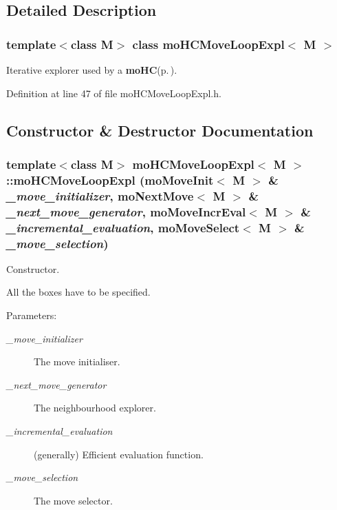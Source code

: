 \subsection{Detailed Description}
\subsubsection*{template$<$class M$>$ class mo\-HCMove\-Loop\-Expl$<$ M $>$}

Iterative explorer used by a {\bf mo\-HC}{\rm (p.\,\pageref{classmo_h_c})}. 



Definition at line 47 of file mo\-HCMove\-Loop\-Expl.h.

\subsection{Constructor \& Destructor Documentation}
\subsubsection{\setlength{\rightskip}{0pt plus 5cm}template$<$class M$>$ {\bf mo\-HCMove\-Loop\-Expl}$<$ M $>$::{\bf mo\-HCMove\-Loop\-Expl} ({\bf mo\-Move\-Init}$<$ M $>$ \& {\em \_\-move\_\-initializer}, {\bf mo\-Next\-Move}$<$ M $>$ \& {\em \_\-next\_\-move\_\-generator}, {\bf mo\-Move\-Incr\-Eval}$<$ M $>$ \& {\em \_\-incremental\_\-evaluation}, {\bf mo\-Move\-Select}$<$ M $>$ \& {\em \_\-move\_\-selection})\hspace{0.3cm}{\tt  [inline]}}\label{classmo_h_c_move_loop_expl_a0}


Constructor. 

All the boxes have to be specified.

\begin{Desc}
\item[Parameters:]
\begin{description}
\item[{\em \_\-move\_\-initializer}]The move initialiser. \item[{\em \_\-next\_\-move\_\-generator}]The neighbourhood explorer. \item[{\em \_\-incremental\_\-evaluation}](generally) Efficient evaluation function. \item[{\em \_\-move\_\-selection}]The move selector. \end{description}
\end{Desc}


